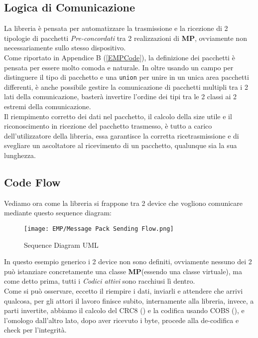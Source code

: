 \subsection{Logica di Comunicazione}
\vspace{-5mm}
La libreria è pensata per automatizzare la trasmissione e la ricezione di 2 tipologie di pacchetti \textit{Pre-concordati} tra 2 realizzazioni di \textbf{MP}, ovviamente non necessariamente sullo stesso dispositivo.\\
Come riportato in Appendice B (\ref{EMPCode}), la definizione dei pacchetti è pensata per essere molto comoda e naturale. In oltre usando un campo per distinguere il tipo di pacchetto e una \verb|union| per unire in un unica area pacchetti differenti, è anche possibile gestire la comunicazione di pacchetti multipli tra i 2 lati della comunicazione, basterà invertire l'ordine dei tipi tra le 2 classi ai 2 estremi della comunicazione.\\
Il riempimento corretto dei dati nel pacchetto, il calcolo della size utile e il riconoscimento in ricezione del pacchetto trasmesso, è tutto a carico dell'utilizzatore della libreria, essa garantisce la corretta ricetrasmissione e di svegliare un ascoltatore al ricevimento di un pacchetto, qualunque sia la sua lunghezza.


\newpage
\subsection{Code Flow}\label{sub:codeFlow}
Vediamo ora come la libreria si frappone tra 2 device che vogliono comunicare mediante questo sequence diagram:\\
\begin{figure}[h]
	\centering
	\caption[Sequence Diagram UML di EMP]{Sequence Diagram UML}
	\texttt{[image: EMP/Message Pack Sending Flow.png]}
\end{figure}

\noindent
In questo esempio generico i 2 device non sono definiti, ovviamente nessuno dei 2 può istanziare concretamente una classe \textbf{MP}(essendo una classe virtuale), ma come detto prima, tutti i \textit{Codici attivi} sono racchiusi lì dentro.\\
Come si può osservare, eccetto il riempire i dati, inviarli e attendere che arrivi qualcosa, per gli attori il lavoro finisce subito, internamente alla libreria, invece, a parti invertite, abbiamo il calcolo del CRC8 (\cite{CRC8}) e la codifica usando COBS (\cite{COBS}), e l'omologo dall'altro lato, dopo aver ricevuto i byte, procede alla de-codifica e check per l'integrità.\\

